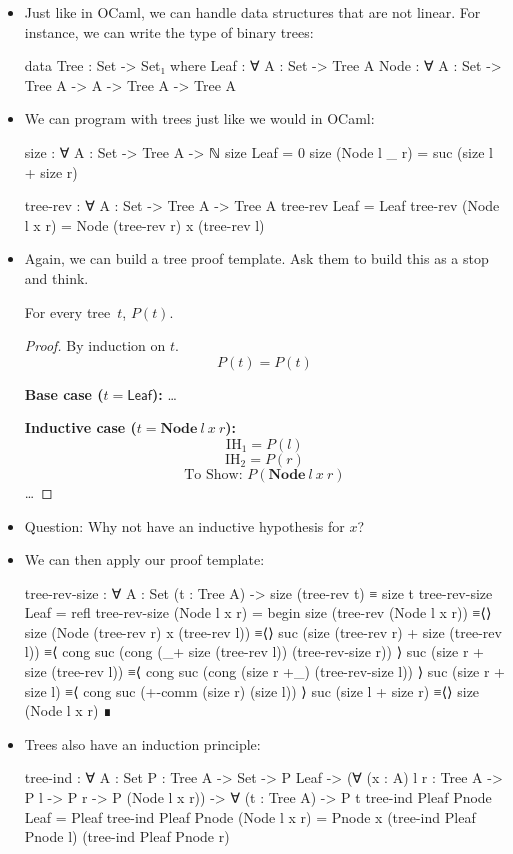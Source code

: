 \documentclass{lecturenotes}
\begin{document}
\begin{itemize}
\item Just like in OCaml, we can handle data structures that are not linear.
  For instance, we can write the type of binary trees:
\begin{code}
data Tree : Set -> Set₁ where
  Leaf : ∀ {A : Set} -> Tree A
  Node : ∀ {A : Set} -> Tree A -> A -> Tree A -> Tree A
\end{code}

\item We can program with trees just like we would in OCaml:
\begin{code}
size : ∀ {A : Set} -> Tree A -> ℕ
size Leaf = 0
size (Node l _ r) = suc (size l + size r)

tree-rev : ∀ {A : Set} -> Tree A -> Tree A
tree-rev Leaf = Leaf
tree-rev (Node l x r) = Node (tree-rev r) x (tree-rev l)
\end{code}

\item Again, we can build a tree proof template.
  Ask them to build this as a stop and think.
\begin{thm}
  For every tree~$t$, $P(t)$.
\end{thm}
\begin{proof}
  By induction on $t$.
  $$P(t) = P(t)$$

  \noindent\textbf{Base case ($t = \textsf{Leaf}$):} \dots

  \noindent\textbf{Inductive case ($t = \textbf{Node}~l~x~r$):}
  $$\text{IH}_1 = P(l)$$
  $$\text{IH}_2 = P(r)$$
  $$\text{To Show: } P(\textbf{Node}~l~x~r)$$
  \dots
\end{proof}
\item Question: Why not have an inductive hypothesis for $x$?

\item We can then apply our proof template:
\begin{code}
tree-rev-size : ∀ {A : Set} (t : Tree A) -> size (tree-rev t) ≡ size t
tree-rev-size Leaf = refl
tree-rev-size (Node l x r) =
  begin
    size (tree-rev (Node l x r))
  ≡⟨⟩
    size (Node (tree-rev r) x (tree-rev l))
  ≡⟨⟩
    suc (size (tree-rev r) + size (tree-rev l))
  ≡⟨ cong suc (cong (_+ size (tree-rev l)) (tree-rev-size r)) ⟩
    suc (size r + size (tree-rev l))
  ≡⟨ cong suc (cong (size r +_) (tree-rev-size l)) ⟩
    suc (size r + size l)
  ≡⟨ cong suc (+-comm (size r) (size l)) ⟩
    suc (size l + size r)
  ≡⟨⟩
    size (Node l x r)
  ∎
\end{code}

\item Trees also have an induction principle:

\begin{code}
tree-ind : ∀ {A : Set} {P : Tree A -> Set} ->
  P Leaf ->
  (∀ (x : A) {l r : Tree A} -> P l -> P r -> P (Node l x r)) ->
  ∀ (t : Tree A) -> P t
tree-ind Pleaf Pnode Leaf = Pleaf
tree-ind Pleaf Pnode (Node l x r) =
  Pnode x (tree-ind Pleaf Pnode l)
          (tree-ind Pleaf Pnode r)
\end{code}
  
\end{itemize}
\end{document}
